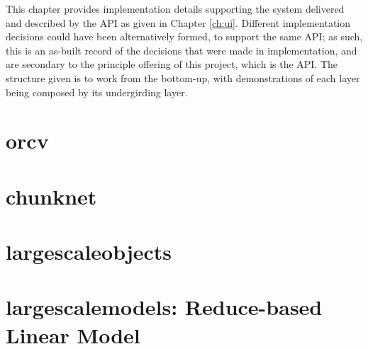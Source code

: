 This chapter provides implementation details supporting the system delivered and described by the API as given in Chapter \cref{ch:ui}.
Different implementation decisions could have been alternatively formed, to support the same API; as such, this is an as-built record of the decisions that were made in implementation, and are secondary to the principle offering of this project, which is the API.
The structure given is to work from the bottom-up, with demonstrations of each layer being composed by its undergirding layer.

\section{orcv}

\section{chunknet}

\section{largescaleobjects}

\section{largescalemodels: Reduce-based Linear Model}

